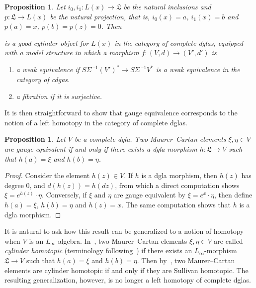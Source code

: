 \documentclass[a4paper,reqno]{amsart}
\theoremstyle{plain}
\newtheorem{prop}[thm]{Proposition}
\theoremstyle{definition}
\theoremstyle{remark}
\newcommand{\lie}[1]{\mathfrak{#1}}
\begin{document}
\begin{prop}\label{result:cyl_dgla}
  Let $i_0, i_1 \colon L(x) \to \lie{L}$ be the natural inclusions and $p \colon \lie{L} \to L(x)$ be the natural projection, that is, $i_0(x)=a$, $i_1(x)=b$ and $p(a)=x$, $p(b)=p(z)=0$. Then 
  \begin{center}
  \end{center}
  is a good cylinder object for $L(x)$ in the category of complete dglas, equipped with a model structure in which a morphism $f \colon (V,d) \to (V',d')$ is
  \begin{enumerate}
    \item a weak equivalence if\/ $S\Sigma^{-1}(V')^* \to S\Sigma^{-1}V^*$ is a weak equivalence in the category of cdgas.
    \item a fibration if it is surjective.
  \end{enumerate}
\end{prop}

It is then straightforward to show that gauge equivalence corresponds to the notion of a left homotopy in the category of complete dglas.

\begin{prop}%
  Let $V$ be a complete dgla. 
  Two Maurer--Cartan elements $\xi, \eta \in V$ are gauge equivalent if and only if there exists a dgla morphism $h \colon \lie{L} \to V$ such that $h(a)=\xi$ and $h(b) = \eta$. 
\end{prop}

\begin{proof}
  Consider the element $h(z) \in V$. 
  If $h$ is a dgla morphism, then $h(z)$ has degree 0, and $d(h(z)) = h(dz)$, from which a direct computation shows $\xi = e^{h(z)} \cdot \eta$.
  Conversely, if $\xi$ and $\eta$ are gauge equivalent by $\xi = e^x \cdot \eta$, then define $h(a) = \xi$, $h(b) = \eta$ and $h(z) = x$. 
  The same computation shows that $h$ is a dgla morphism.
\end{proof}

It is natural to ask how this result can be generalized to a notion of homotopy when $V$ is an $L_{\infty}$-algebra.
In~\cite{bm13a}, two Maurer--Cartan elements $\xi, \eta \in V$ are called \emph{cylinder homotopic} (terminology following~\cite{dp16}) if there exists an $L_\infty$-morphism $\mathfrak{L} \to V$ such that $h(a)=\xi$ and $h(b) = \eta$.
Then by~\cite[Proposition 4.5]{bm13a}, two Maurer--Cartan elements are cylinder homotopic if and only if they are Sullivan homotopic.
The resulting generalization, however, is no longer a left homotopy of complete dglas.
\end{document}
